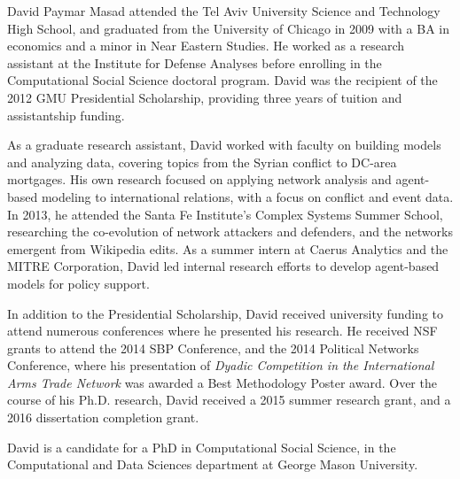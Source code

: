 \documentclass[11 pt]{report}
\begin{document}
%
%

%
%
%

\printbibliography

\cvpage

David Paymar Masad attended the Tel Aviv University Science and Technology High School, and graduated from the University of Chicago in 2009 with a BA in economics and a minor in Near Eastern Studies. He worked as a research assistant at the Institute for Defense Analyses before enrolling in the Computational Social Science doctoral program. David was the recipient of the 2012 GMU Presidential Scholarship, providing three years of tuition and assistantship funding.

As a graduate research assistant, David worked with faculty on building models and analyzing data, covering topics from the Syrian conflict to DC-area mortgages. His own research focused on applying network analysis and agent-based modeling to international relations, with a focus on conflict and event data. In 2013, he attended the Santa Fe Institute's Complex Systems Summer School, researching the co-evolution of network attackers and defenders, and the networks emergent from Wikipedia edits. As a summer intern at Caerus Analytics and the MITRE Corporation, David led internal research efforts to develop agent-based models for policy support.

In addition to the Presidential Scholarship, David received university funding to attend numerous conferences where he presented his research. He received NSF grants to attend the 2014 SBP Conference, and the 2014 Political Networks Conference, where his presentation of \emph{Dyadic Competition in the International Arms Trade Network} was awarded a Best Methodology Poster award. Over the course of his Ph.D. research, David received a 2015 summer research grant, and a 2016 dissertation completion grant.

David is a candidate for a PhD in Computational Social Science, in the Computational and Data Sciences department at George Mason University.
\end{document}
